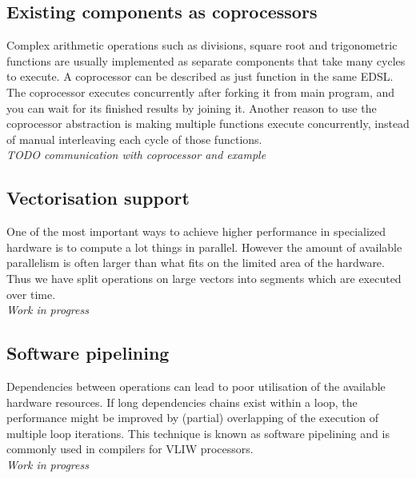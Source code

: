 \documentclass[preprint]{sigplanconf}
\begin{document}
\subsection{Existing components as coprocessors}
Complex arithmetic operations such as divisions, square root and trigonometric functions are usually implemented as separate components that take many cycles to execute.
A coprocessor can be described as just function in the same EDSL.
The coprocessor executes concurrently after forking it from main program, and you can wait for its finished results by joining it.
Another reason to use the coprocessor abstraction is making multiple functions execute concurrently, instead of manual interleaving each cycle of those functions. \\

\textit {TODO communication with coprocessor and example}

\subsection{Vectorisation support}
One of the most important ways to achieve higher performance in specialized hardware is to compute a lot things in parallel.
However the amount of available parallelism is often larger than what fits on the limited area of the hardware.
Thus we have split operations on large vectors into segments which are executed over time. \\

\textit{Work in progress}


\subsection{Software pipelining}
Dependencies between operations can lead to poor utilisation of the available hardware resources.
If long dependencies chains exist within a loop, the performance might be improved by (partial) overlapping of the execution of multiple loop iterations.
This technique is known as software pipelining and is commonly used in compilers for VLIW processors. \\

\textit{Work in progress}
\end{document}
